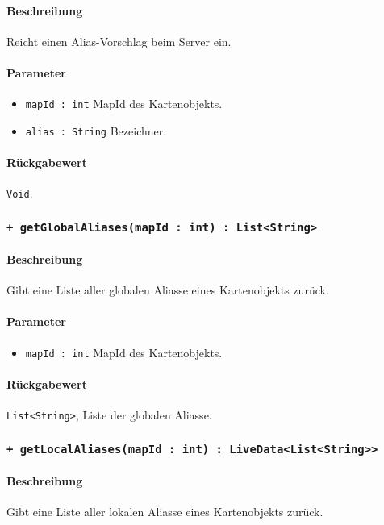 \paragraph*{Beschreibung}
Reicht einen Alias-Vorschlag beim Server ein.
\paragraph*{Parameter}
\begin{itemize}
    \item \texttt{mapId : int} MapId des Kartenobjekts.
    \item \texttt{alias : String} Bezeichner.
\end{itemize}
\paragraph*{Rückgabewert}
\texttt{Void}.

\subsubsection*{\texttt{+ getGlobalAliases(mapId : int) : List<String>}}%
\paragraph*{Beschreibung}
Gibt eine Liste aller globalen Aliasse eines Kartenobjekts zurück.
\paragraph*{Parameter}
\begin{itemize}
    \item \texttt{mapId : int} MapId des Kartenobjekts.
\end{itemize}
\paragraph*{Rückgabewert}
\texttt{List<String>}, Liste der globalen Aliasse.

\subsubsection*{\texttt{+ getLocalAliases(mapId : int) : LiveData<List<String>>}}%
\paragraph*{Beschreibung}
Gibt eine Liste aller lokalen Aliasse eines Kartenobjekts zurück.
